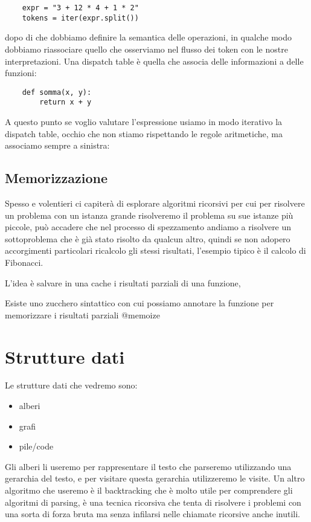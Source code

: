 \begin{lstlisting}
    expr = "3 + 12 * 4 + 1 * 2"
    tokens = iter(expr.split())
\end{lstlisting}

dopo di che dobbiamo definire la semantica delle operazioni, in qualche modo dobbiamo riassociare quello che osserviamo nel flusso dei token con le nostre interpretazioni. Una dispatch table è quella che associa delle informazioni a delle funzioni:

\begin{lstlisting}
    def somma(x, y):
        return x + y
\end{lstlisting}

A questo punto se voglio valutare l'espressione usiamo in modo iterativo la dispatch table, occhio che non stiamo rispettando le regole aritmetiche, ma associamo sempre a sinistra:

\subsection{Memorizzazione}
Spesso e volentieri ci capiterà di esplorare algoritmi ricorsivi per cui per risolvere un problema con un istanza grande risolveremo il problema su sue istanze più piccole, può accadere che nel processo di spezzamento andiamo a risolvere un sottoproblema che è già stato risolto da qualcun altro, quindi se non adopero accorgimenti particolari ricalcolo gli stessi risultati, l'esempio tipico è il calcolo di Fibonacci.

L'idea è salvare in una cache i risultati parziali di una funzione,

Esiste uno zucchero sintattico con cui possiamo annotare la funzione per memorizzare i risultati parziali @memoize

\section{Strutture dati}
Le strutture dati che vedremo sono:
\begin{itemize}
    \item alberi
    \item grafi
    \item pile/code
\end{itemize}

Gli alberi li useremo per rappresentare il testo che parseremo utilizzando una gerarchia del testo, e per visitare questa gerarchia utilizzeremo le visite.
Un altro algoritmo che useremo è il backtracking che è molto utile per comprendere gli algoritmi di parsing, è una tecnica ricorsiva che tenta di risolvere i problemi con una sorta di forza bruta ma senza infilarsi nelle chiamate ricorsive anche inutili.


